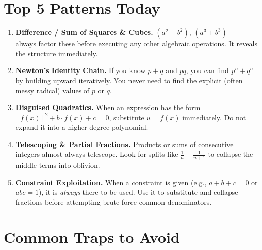 \documentclass[11pt,a4paper]{article}
\begin{document}
\section*{Top 5 Patterns Today}

\begin{enumerate}[leftmargin=2em, itemsep=4pt]
  \item \textbf{Difference / Sum of Squares \& Cubes.}
        $(a^2-b^2)$, $(a^3\pm b^3)$ — always factor these before executing any other algebraic operations. It reveals the structure immediately. 
  \item \textbf{Newton's Identity Chain.}
        If you know $p+q$ and $pq$, you can find $p^n+q^n$ by building upward iteratively. You never need to find the explicit (often messy radical) values of $p$ or $q$. 
  \item \textbf{Disguised Quadratics.}
        When an expression has the form $[f(x)]^2 + b\cdot f(x) + c = 0$, substitute $u=f(x)$ immediately. Do not expand it into a higher-degree polynomial. 
  \item \textbf{Telescoping \& Partial Fractions.}
        Products or sums of consecutive integers almost always telescope. Look for splits like $\frac{1}{n}-\frac{1}{n+1}$ to collapse the middle terms into oblivion. 
  \item \textbf{Constraint Exploitation.}
        When a constraint is given (e.g., $a+b+c=0$ or $abc=1$), it is \emph{always} there to be used. Use it to substitute and collapse fractions before attempting brute-force common denominators. 
\end{enumerate}

\section*{Common Traps to Avoid}
\end{document}
